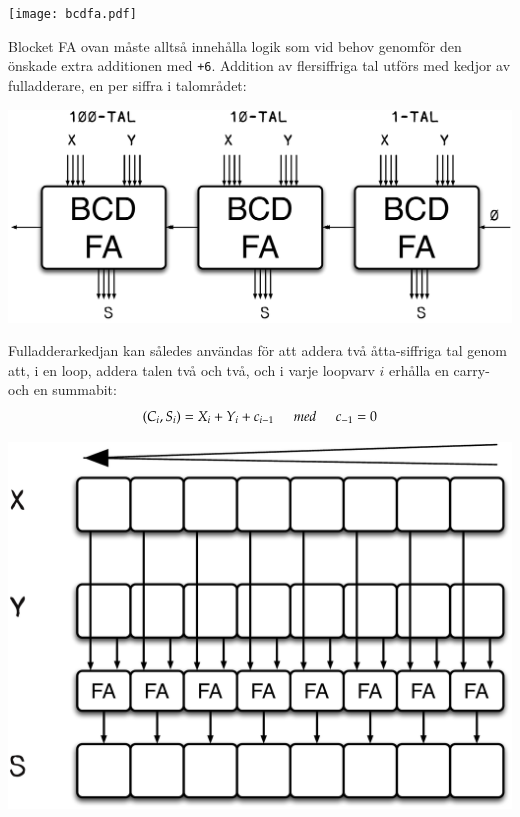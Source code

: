 \documentclass[oneside,10pt,a4paper,swedish]{scrbook}
\newcommand{\asm}[1]{\texttt{#1}}
\begin{document}
\begin{center}
\texttt{[image: bcdfa.pdf]}
\end{center}

Blocket FA ovan måste alltså innehålla logik som vid behov genomför den önskade extra additionen med \asm{+6}. Addition av flersiffriga tal utförs  med kedjor av fulladderare, en per siffra i talområdet:

\begin{center}
\includegraphics[scale = 0.3]{bcdfas.pdf}
\end{center}


Fulladderarkedjan kan således användas för att addera två åtta-siffriga tal genom att, i en loop, addera talen två och två, och i varje loopvarv $i$ erhålla en carry- och en summabit: \[(C_i,S_i) = X_i + Y_i + c_{i-1} \hspace{5mm}med\hspace{5mm} c_{-1}=0\]

\begin{center}
\includegraphics[scale = 0.4]{fakedja.pdf}
\end{center}
\end{document}
